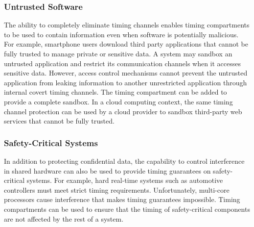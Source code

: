 \subsubsection{Untrusted Software} 

The ability to completely eliminate timing channels enables timing compartments
to be used to contain information even when software is potentially malicious.
For example, smartphone users download third party applications
that cannot be fully trusted to manage private or sensitive data. A system may
sandbox an untrusted application and restrict its communication channels
when it accesses sensitive data. However, access control mechanisms cannot
prevent the untrusted application from leaking information to another 
unrestricted
application through internal covert timing channels. The timing compartment can 
be added to provide a complete sandbox.  In a cloud computing
context, the same timing channel protection can be used
by a cloud provider to sandbox third-party web services that cannot be fully 
trusted.

\subsubsection{Safety-Critical Systems}

In addition to protecting confidential data, the capability to control 
interference in shared hardware can also be used to provide timing guarantees on 
safety-critical systems. For example, hard real-time systems such as automotive 
controllers must meet strict timing requirements. Unfortunately, multi-core
processors cause interference that makes timing guarantees impossible. Timing
compartments can be used to ensure that the timing of safety-critical components 
are not affected by the rest of a system.

